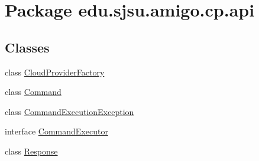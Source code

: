 \hypertarget{namespaceedu_1_1sjsu_1_1amigo_1_1cp_1_1api}{}\section{Package edu.\+sjsu.\+amigo.\+cp.\+api}
\label{namespaceedu_1_1sjsu_1_1amigo_1_1cp_1_1api}
\subsection*{Classes}
\begin{DoxyCompactItemize}
\item 
class \hyperlink{classedu_1_1sjsu_1_1amigo_1_1cp_1_1api_1_1_cloud_provider_factory}{Cloud\+Provider\+Factory}
\item 
class \hyperlink{classedu_1_1sjsu_1_1amigo_1_1cp_1_1api_1_1_command}{Command}
\item 
class \hyperlink{classedu_1_1sjsu_1_1amigo_1_1cp_1_1api_1_1_command_execution_exception}{Command\+Execution\+Exception}
\item 
interface \hyperlink{interfaceedu_1_1sjsu_1_1amigo_1_1cp_1_1api_1_1_command_executor}{Command\+Executor}
\item 
class \hyperlink{classedu_1_1sjsu_1_1amigo_1_1cp_1_1api_1_1_response}{Response}
\end{DoxyCompactItemize}
